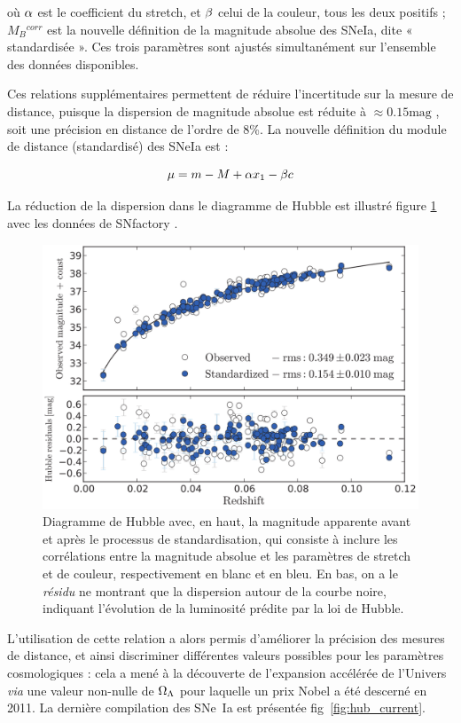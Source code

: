 \documentclass[a4paper, 12pt, svgnames]{article}
\begin{document}
où $\alpha$ est le coefficient du stretch, et $\beta$ celui de la couleur, tous les
deux positifs ; $M_B{}^{corr}$ est la nouvelle définition de la magnitude
absolue des SNeIa, dite « standardisée ». Ces trois paramètres sont ajustés
simultanément sur l'ensemble des données disponibles.

Ces relations supplémentaires permettent de réduire l'incertitude sur la
mesure de distance, puisque la dispersion de magnitude absolue est réduite à
$\approx 0.15 \mathrm{mag}$ \cite{betoule_improved_2014}, soit une précision en
distance de l'ordre de 8\%. La nouvelle définition du module de distance
(standardisé) des SNeIa est :

\begin{equation}
    \mu = m - M +\alpha x_1 - \beta c
\end{equation}

La réduction de la dispersion dans le diagramme de Hubble est illustré figure
\ref{disp_20} avec les données de SNfactory \cite{rigault_strong_2018}.

\begin{figure}[htbp!]
    \centering
    \includegraphics[width=.5\linewidth]{Rapport_figures/disp_beau.png}
    \captionsetup{justification=centering}
    \caption{Diagramme de Hubble avec, en haut, la magnitude apparente avant et
        après le processus de standardisation, qui consiste à inclure les
        corrélations entre la magnitude absolue et les paramètres de stretch et
        de couleur, respectivement en blanc et en bleu. En bas, on a le
        \textit{résidu} ne montrant que la dispersion autour de la courbe noire,
        indiquant l'évolution de la luminosité prédite par la loi de Hubble.}
    \label{disp_20}
\end{figure}

L'utilisation de cette relation a alors permis d'améliorer la précision des
mesures de distance, et ainsi discriminer différentes valeurs possibles pour les
paramètres cosmologiques : cela a mené à la découverte de l'expansion accélérée
de l'Univers \textit{via} une valeur non-nulle de $\Omega_\Lambda$ pour laquelle un prix
Nobel a été descerné en 2011. La dernière compilation des SNe~Ia est
présentée fig~\ref{fig:hub_current}.
\end{document}

